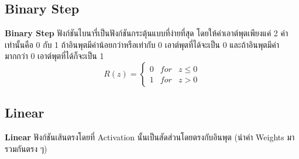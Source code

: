 \subsection{Binary Step}

\textbf{Binary Step} ฟังก์ชันไบนารี่เป็นฟังก์ชันกระตุ้นแบบที่ง่ายที่สุด โดยให้ค่าเอาต์พุตเพียงแค่ 2 ค่าเท่านั้นคือ 0 กับ 1 ถ้าอินพุตมีค่าน้อยกว่าหรือเท่ากับ 0 เอาต์พุตที่ได้จะเป็น 0 และถ้าอินพุตมีค่ามากกว่า 0 เอาต์พุตที่ได้ก็จะเป็น 1
%
\begin{equation}
      R(z) = \left\{
      \begin{array}{lll}
          0 & for & z \leq 0 \\
          1 & for & z > 0
      \end{array}
      \right.
  \end{equation}

\subsection{Linear}

\textbf{Linear} ฟังก์ชันเส้นตรงโดยที่ Activation นั้นเป็นสัดส่วนโดยตรงกับอินพุต (นำค่า Weights มารวมกันตรง ๆ)

